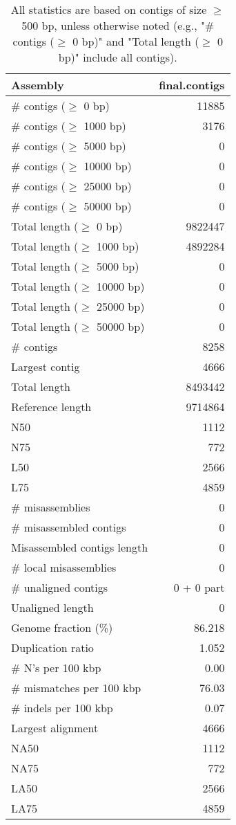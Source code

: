 \documentclass[12pt,a4paper]{article}
\begin{document}
\begin{table}[ht]
\begin{center}
\caption{All statistics are based on contigs of size $\geq$ 500 bp, unless otherwise noted (e.g., "\# contigs ($\geq$ 0 bp)" and "Total length ($\geq$ 0 bp)" include all contigs).}
\begin{tabular}{|l*{1}{|r}|}
\hline
Assembly & final.contigs \\ \hline
\# contigs ($\geq$ 0 bp) & 11885 \\ \hline
\# contigs ($\geq$ 1000 bp) & 3176 \\ \hline
\# contigs ($\geq$ 5000 bp) & 0 \\ \hline
\# contigs ($\geq$ 10000 bp) & 0 \\ \hline
\# contigs ($\geq$ 25000 bp) & 0 \\ \hline
\# contigs ($\geq$ 50000 bp) & 0 \\ \hline
Total length ($\geq$ 0 bp) & 9822447 \\ \hline
Total length ($\geq$ 1000 bp) & 4892284 \\ \hline
Total length ($\geq$ 5000 bp) & 0 \\ \hline
Total length ($\geq$ 10000 bp) & 0 \\ \hline
Total length ($\geq$ 25000 bp) & 0 \\ \hline
Total length ($\geq$ 50000 bp) & 0 \\ \hline
\# contigs & 8258 \\ \hline
Largest contig & 4666 \\ \hline
Total length & 8493442 \\ \hline
Reference length & 9714864 \\ \hline
N50 & 1112 \\ \hline
N75 & 772 \\ \hline
L50 & 2566 \\ \hline
L75 & 4859 \\ \hline
\# misassemblies & 0 \\ \hline
\# misassembled contigs & 0 \\ \hline
Misassembled contigs length & 0 \\ \hline
\# local misassemblies & 0 \\ \hline
\# unaligned contigs & 0 + 0 part \\ \hline
Unaligned length & 0 \\ \hline
Genome fraction (\%) & 86.218 \\ \hline
Duplication ratio & 1.052 \\ \hline
\# N's per 100 kbp & 0.00 \\ \hline
\# mismatches per 100 kbp & 76.03 \\ \hline
\# indels per 100 kbp & 0.07 \\ \hline
Largest alignment & 4666 \\ \hline
NA50 & 1112 \\ \hline
NA75 & 772 \\ \hline
LA50 & 2566 \\ \hline
LA75 & 4859 \\ \hline
\end{tabular}
\end{center}
\end{table}
\end{document}
